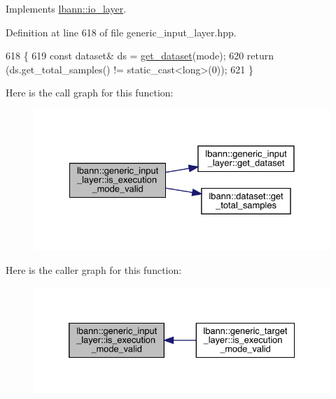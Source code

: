 Implements \hyperlink{classlbann_1_1io__layer_a37e2f77a99ee44106ac7d9fd3a275dcc}{lbann\+::io\+\_\+layer}.



Definition at line 618 of file generic\+\_\+input\+\_\+layer.\+hpp.


\begin{DoxyCode}
618                                                                    \{
619     \textcolor{keyword}{const} dataset& ds = \hyperlink{classlbann_1_1generic__input__layer_af5699540797c22d8846028e578a6fc59}{get\_dataset}(mode);
620     \textcolor{keywordflow}{return} (ds.get\_total\_samples() != \textcolor{keyword}{static\_cast<}\textcolor{keywordtype}{long}\textcolor{keyword}{>}(0));
621   \}
\end{DoxyCode}
Here is the call graph for this function\+:\nopagebreak
\begin{figure}[H]
\begin{center}
\leavevmode
\includegraphics[width=328pt]{classlbann_1_1generic__input__layer_a31082076a8aad937eef3cadc0b5e1b27_cgraph}
\end{center}
\end{figure}
Here is the caller graph for this function\+:\nopagebreak
\begin{figure}[H]
\begin{center}
\leavevmode
\includegraphics[width=332pt]{classlbann_1_1generic__input__layer_a31082076a8aad937eef3cadc0b5e1b27_icgraph}
\end{center}
\end{figure}
\mbox{\label{classlbann_1_1generic__input__layer_ae5a542333eaf447a05fc586848e7c94c}} 
